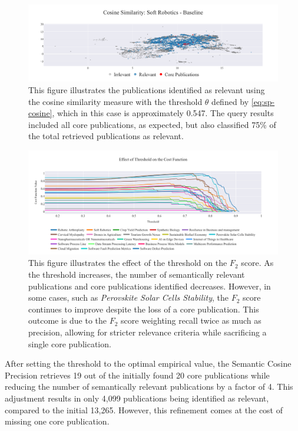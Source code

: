 \begin{figure}[!ht]
	\hspace*{-1cm}	
	\includegraphics[scale=0.45]{pics/sr-cosine-baseline.pdf}
	\caption[Semantic Cosine Similarity: Soft Robotics]{This figure illustrates the publications identified as relevant using the cosine similarity measure with the threshold $\theta$ defined by \autoref{eq:sp-cosine}, which in this case is approximately 0.547. The query results included all core publications, as expected, but also classified 75\% of the total retrieved publications as relevant.}\label{fig:sr-cosine-baseline}
\end{figure}

\begin{figure}[!hb]
	\hspace*{-.5cm}
	\includegraphics[scale=0.45]{pics/threshold-analysis.pdf}
	\caption[Semantic Cosine Threshold: Empirical Analysis]{This figure illustrates the effect of the threshold on the $F_2$ score. As the threshold increases, the number of semantically relevant publications and core publications identified decreases. However, in some cases, such as \textit{Perovskite Solar Cells Stability}, the $F_2$ score continues to improve despite the loss of a core publication. This outcome is due to the $F_2$ score weighting recall twice as much as precision, allowing for stricter relevance criteria while sacrificing a single core publication.}\label{fig:threshold-analysis}
\end{figure}

After setting the threshold to the optimal empirical value, the Semantic Cosine Precision retrieves 19 out of the initially found 20 core publications while reducing the number of semantically relevant publications by a factor of 4. This adjustment results in only 4,099 publications being identified as relevant, compared to the initial 13,265. However, this refinement comes at the cost of missing one core publication.

